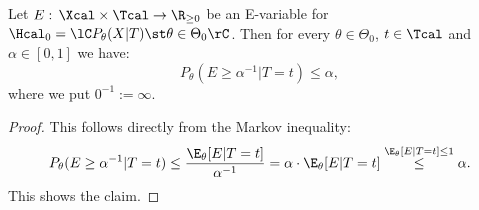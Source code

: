 \begin{Lem}
    \label{lem:e-variable-I-error}
    Let  $E:\, \Xcal \times \Tcal \to \R_{\ge0}$ be an E-variable for $\Hcal_0=\lC P_\theta(X|T) \st \theta \in \Theta_0 \rC$.
    Then for every $\theta \in \Theta_0$, $t \in \Tcal$ and $\alpha \in [0,1]$ we have:
    \[  P_\theta(E \ge \alpha^{-1}|T=t) \le \alpha,   \]
    where we put $0^{-1}:=\infty$.
    \begin{proof}
        This follows directly from the Markov inequality:
        \begin{align*}
            P_\theta(E \ge \alpha^{-1}|T=t) \le \frac{\E_\theta[E|T=t]}{\alpha^{-1}} = \alpha \cdot \E_\theta[E|T=t] 
            \stackrel{\E_\theta[E|T=t] \le 1 }{\le} \alpha.
        \end{align*}
        This shows the claim.
    \end{proof}
\end{Lem}


